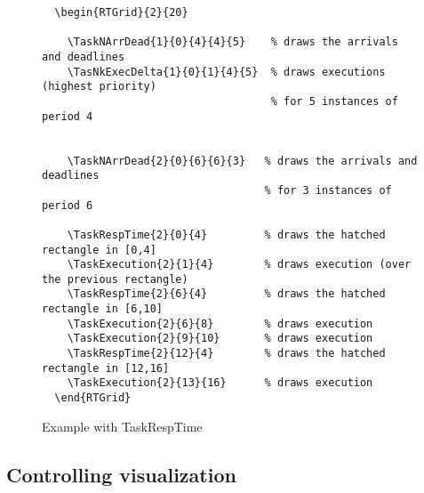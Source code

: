 \documentclass{article}
\begin{document}
\begin{figure}
  \centering
  \begin{RTGrid}{2}{20}
  

 

  \end{RTGrid}  
\begin{verbatim}
  \begin{RTGrid}{2}{20}
  
    \TaskNArrDead{1}{0}{4}{4}{5}    % draws the arrivals and deadlines
    \TasNkExecDelta{1}{0}{1}{4}{5}  % draws executions (highest priority) 
                                    % for 5 instances of period 4 

 
    \TaskNArrDead{2}{0}{6}{6}{3}   % draws the arrivals and deadlines
                                   % for 3 instances of period 6 

    \TaskRespTime{2}{0}{4}         % draws the hatched rectangle in [0,4]
    \TaskExecution{2}{1}{4}        % draws execution (over the previous rectangle)
    \TaskRespTime{2}{6}{4}         % draws the hatched rectangle in [6,10]
    \TaskExecution{2}{6}{8}        % draws execution
    \TaskExecution{2}{9}{10}       % draws execution
    \TaskRespTime{2}{12}{4}        % draws the hatched rectangle in [12,16]
    \TaskExecution{2}{13}{16}      % draws execution   
  \end{RTGrid}   
\end{verbatim}
  \caption{Example with TaskRespTime}
  \label{fig:resp-time}
\end{figure}


\subsection{Controlling visualization}
\end{document}

